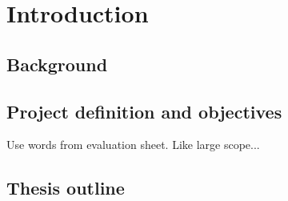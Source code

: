 \graphicspath{{introduction/fig/}}

\chapter{Introduction}
\label{chap:introduction}

\section{Background}

\section{Project definition and objectives}
    Use words from evaluation sheet. Like large scope...
\section{Thesis outline}
    


